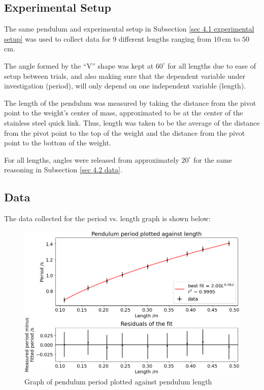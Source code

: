 \documentclass[11pt]{article}
\begin{document}
\begin{multicols}{2}
\subsection{Experimental Setup} \label{sec 5.1 experimental setup}
The same pendulum and experimental setup in Subsection \ref{sec 4.1 experimental setup} was used to collect data for 9 different lengths ranging from $10\,$cm to $50\,$cm.

The angle formed by the ``V'' shape was kept at $60^\circ$ for all lengths due to ease of setup between trials, and also making sure that the dependent variable under investigation (period), will only depend on one independent variable (length).

The length of the pendulum was measured by taking the distance from the pivot point to the weight's center of mass, approximated to be at the center of the stainless steel quick link. Thus, length was taken to be the average of the distance from the pivot point to the top of the weight and the distance from the pivot point to the bottom of the weight.

For all lengths, angles were released from approximately $20^\circ$ for the same reasoning in Subsection \ref{sec 4.2 data}.

\subsection{Data} \label{sec 5.2 data}
The data collected for the period vs. length graph is shown below:

\begin{figure}[H]
    \centering
    \includegraphics[width=\linewidth]{../figures/period_vs_length.png}
    \caption{\centering Graph of pendulum period plotted against pendulum length}
    \label{fig:figure 6}
\end{figure}


\end{multicols}
\end{document}
